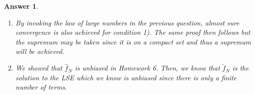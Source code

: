 \documentclass[12pt]{article}
\theoremstyle{colon}
\newtheorem*{answer}{Answer}
\begin{document}
\begin{answer}
\begin{enumerate}[label=\arabic*)]
      We now write out the problem
      \begin{gather*}
        \lvert \widehat{f}_N(x) - \tilde{f}_N(x) \rvert = \lvert f(x)^T \widehat{\alpha} - f(x)^T \tilde{\alpha} \rvert
      \end{gather*}
      However, we just showed that $\tilde{\alpha} \xrightarrow{p} n(f(X)^T f(X))^{-1} \widehat{\alpha}$. So
      \begin{gather*}
        \lvert f(x)^T \widehat{\alpha} - f(x)^T \tilde{\alpha} \rvert \xrightarrow{p} \lvert f(x)^T \widehat{\alpha} - f(x)^T n(f(X)^T f(X))^{-1} \widehat{\alpha} \rvert
      \end{gather*}
      By the law of large numbers $n(f(X)^T f(X))^{-1} \xrightarrow{p} \mathbb{E}[f(X)^T f(X))]^{-1}$. By the orthogonality assumption, $\mathbb{E}[f(X)^T f(X))]^{-1} = I$. This yields
      \begin{gather*}
        \lvert f(x)^T \widehat{\alpha} - f(x)^T n(f(X)^T f(X))^{-1} \widehat{\alpha} \rvert \xrightarrow{p} \lvert f(x)^T \widehat{\alpha} - f(x)^T \widehat{\alpha} \rvert = 0
      \end{gather*}

    \item By invoking the law of large numbers in the previous question, almost sure convergence is also achieved for condition 1). The same proof then follows but the supremum may be taken since it is on a compact set and thus a supremum will be achieved.

    \item We showed that $\widehat{f}_N$ is unbiased in Homework 6. Then, we know that $\tilde{f}_N$ is the solution to the LSE which we know is unbiased since there is only a finite number of terms.
  \end{enumerate}
\end{answer}

\clearpage
\end{document}
